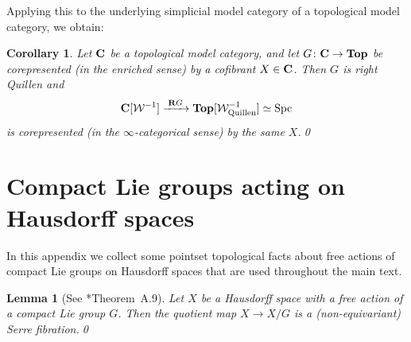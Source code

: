 \documentclass[reqno]{memo-l}
\theoremstyle{mythm}
\newtheorem{lemma}[thm]{Lemma}
\newtheorem{cor}[thm]{Corollary}
\theoremstyle{definition}
\numberwithin{equation}{section}
\newcommand{\Ww}{{\mathcal{W}}}
\DeclareMathOperator{\Spc}{Spc}
\newcommand{\cat}[1]{\textbf{\textup{#1}}}
\begin{document}
Applying this to the underlying simplicial model category of a topological model category, we obtain:

\begin{cor}\label{cor:corep-Top}
    Let $\cat{C}$ be a topological model category, and let $G\colon\cat{C}\to\cat{Top}$ be corepresented (in the enriched sense) by a cofibrant $X\in\cat{C}$. Then $G$ is right Quillen and 
    \[
        \cat{C}[\Ww^{-1}]\xrightarrow{\;\cat{R}G\;}\cat{Top}[\Ww_\textup{Quillen}^{-1}]\simeq\Spc
    \]
    is corepresented (in the $\infty$-categorical sense) by the same $X$.\qed
\end{cor}

\section[Compact Lie groups acting on Hausdorff spaces]{Compact Lie groups acting on Hausdorff spaces}\label{app:here-be-pointsets}
In this appendix we collect some pointset topological facts about free actions of compact Lie groups on Hausdorff spaces that are used throughout the main text.

\begin{lemma}[See \cite{koerschgen}*{Theorem~A.9}]\label{lemma:quotient-map-is-fib}
    Let $X$ be a Hausdorff space with a free action of a compact Lie group $G$. Then the quotient map $X\to X/G$ is a (non-equivariant) Serre fibration.\qed
\end{lemma}
\end{document}
